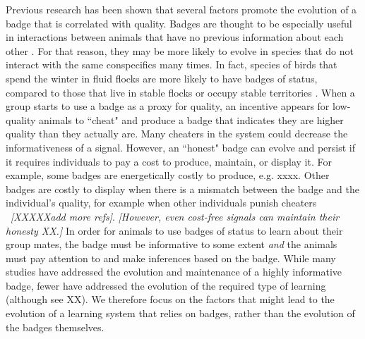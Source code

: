Previous research has been shown that several factors promote the evolution of a badge that is correlated with quality. Badges are thought to be especially useful in interactions between animals that have no previous information about each other \cite{Remy:2010fk,Lemel:1993ve,Solberg:1997uq}. For that reason, they may be more likely to evolve in species that do not interact with the same conspecifics many times. In fact, species of birds that spend the winter in fluid flocks are more likely to have badges of status, compared to those that live in stable flocks or occupy stable territories \cite{Rohwer:1975fk,Tibbetts:2009kx}. When a group starts to use a badge as a proxy for quality, an incentive appears for low-quality animals to ``cheat" and produce a badge that indicates they are higher quality than they actually are. Many cheaters in the system could decrease the informativeness of a signal. However, an ``honest" badge can evolve and persist if it requires individuals to pay a cost to produce, maintain, or display it. For example, some badges are energetically costly to produce, e.g. xxxx. Other badges are costly to display when there is a mismatch between the badge and the individual's quality, for example when other individuals punish cheaters ~\cite{Smith2003AnimalSignals,Tibbetts:2004kx}\textit{[XXXXXadd more refs]}.  
\textit{[However, even cost-free signals can maintain their honesty \cite{Dawkins:1991ly}XX.]} 
In order for animals to use badges of status to learn about their group mates, the badge must be informative to some extent \emph{and} the animals must pay attention to and make inferences based on the badge. While many studies have addressed the evolution and maintenance of a highly informative badge, fewer have addressed the evolution of the required type of learning (although see XX).  We therefore focus on the factors that might lead to the evolution of a learning system that relies on badges, rather than the evolution of the badges themselves.


